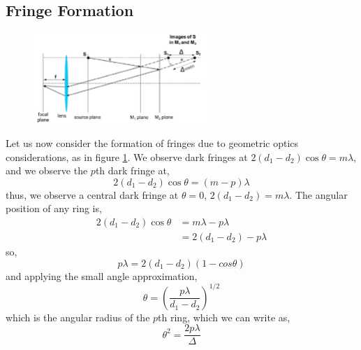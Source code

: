 \documentclass{book}
\begin{document}
{\subsection{Fringe Formation}
\begin{figure}[h]
	\centering
	\includegraphics[width=0.6\textwidth]{fringe.png}
	\caption{}
	\label{fig:fringe}
\end{figure}\noindent
Let us now consider the formation of fringes due to geometric optics considerations, as in figure \ref{fig:fringe}. We observe dark fringes at $2(d_1 - d_2)\cos\theta = m\lambda$, and we observe the $p$th dark fringe at,
\begin{equation}
	2(d_1 - d_2)\cos\theta = (m-p)\lambda
\end{equation} 
thus, we observe a central dark fringe at $\theta = 0$, $2(d_1 - d_2) = m\lambda$. The angular position of any ring is,
\begin{equation}
	\begin{split}
	2(d_1 - d_2)\cos\theta & = m\lambda - p\lambda \\
	& = 2(d_1 - d_2) - p\lambda
	\end{split}
\end{equation}
so,
\begin{equation}
	p\lambda = 2(d_1 - d_2)(1-cos\theta) 
\end{equation}
and applying the small angle approximation,
\begin{equation}
	\theta = \left(\frac{p\lambda}{d_1 - d_2}\right)^{1/2}
\end{equation}
which is the angular radius of the $p$th ring, which we can write as,
\begin{equation}
	\theta^2 = \frac{2p\lambda}{\Delta}
\end{equation}
}
\end{document}
